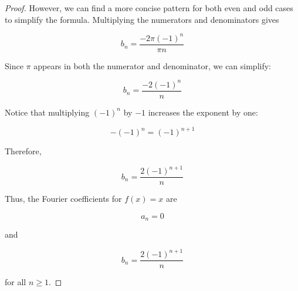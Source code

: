 \documentclass[12pt]{article}
\begin{document}
\begin{enumerate}[label=(\alph*)]
\begin{proof}
    However, we can find a more concise pattern for both even and odd cases to simplify the formula. Multiplying the numerators and denominators gives

    \vspace{.1in}

    \[
    b_n
    =
    \frac{-2\pi(-1)^n}{\pi n}
    \]

    \vspace{.1in}
    
    Since $\pi$ appears in both the numerator and denominator,
    we can simplify:

    \vspace{.1in}
    
    \[
    b_n
    =
    \frac{-2(-1)^n}{n}
    \]

    \vspace{.1in}
    
    Notice that multiplying $(-1)^n$ by $-1$ increases the exponent
    by one:

    \vspace{.1in}
    
    \[
    -(-1)^n = (-1)^{n+1}
    \]

    \vspace{.1in}
    
    Therefore,

    \vspace{.1in}
    
    \[
    b_n
    =
    \frac{2(-1)^{n+1}}{n}
    \]
    
    \vspace{.1in}
    
    Thus, the Fourier coefficients for $f(x)=x$ are

    \vspace{.1in}
    
    \[
    a_n = 0
    \]
    
    and
    
    \[
    b_n = \frac{2(-1)^{n+1}}{n}
    \]
    
    for all $n \geq 1$.

    \vspace{.1in}


\end{proof}
\end{enumerate}
\end{document}
